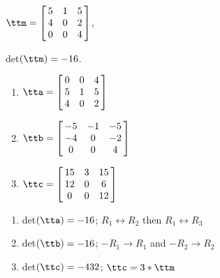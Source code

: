 {$\ttm=\left[\hskip -3pt \begin{array}{ccc} 5&1&5\\  4&0&2
\\  0&0&4\end{array}\hskip -3pt \right] $,

 det$(\ttm)=-16$.
\begin{enumerate}
\item $\tta = \left[\hskip -3pt \begin{array}{ccc} 0&0&4\\  5&1&5
\\  4&0&2\end{array}\hskip -3pt \right] $
\item	$\ttb = \left[\hskip -3pt \begin{array}{ccc} -5&-1&-5\\  -4&0&-2
\\  0&0&4\end{array}\hskip -3pt \right]$
\item	$\ttc = \left[\hskip -3pt \begin{array}{ccc} 15&3&15\\  12&0&6
\\  0&0&12\end{array}\hskip -3pt \right]$
\end{enumerate}} 
{\begin{enumerate}
\item det$(\tta) = -16$; $R_1\leftrightarrow R_2$ then $R_1\leftrightarrow R_3$
\item det$(\ttb) = -16$; $-R_1\rightarrow R_1$ and $-R_2\rightarrow R_2$
\item det$(\ttc) = -432$; $\ttc = 3*\ttm$
\end{enumerate}}



  

